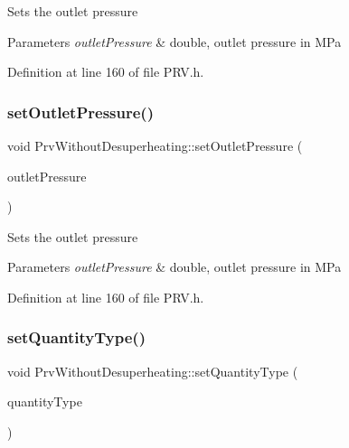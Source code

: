 Sets the outlet pressure


\begin{DoxyParams}{Parameters}
{\em outlet\+Pressure} & double, outlet pressure in M\+Pa \\
\hline
\end{DoxyParams}


Definition at line 160 of file P\+R\+V.\+h.

\mbox{\label{class_prv_without_desuperheating_a0f2a4597b58390e5c4a7c75b38bbebbc}} 
\subsubsection{\texorpdfstring{set\+Outlet\+Pressure()}{setOutletPressure()}\hspace{0.1cm}{\footnotesize\ttfamily [3/3]}}
{\footnotesize\ttfamily void Prv\+Without\+Desuperheating\+::set\+Outlet\+Pressure (\begin{DoxyParamCaption}\item[{double}]{outlet\+Pressure }\end{DoxyParamCaption})\hspace{0.3cm}{\ttfamily [inline]}}

Sets the outlet pressure


\begin{DoxyParams}{Parameters}
{\em outlet\+Pressure} & double, outlet pressure in M\+Pa \\
\hline
\end{DoxyParams}


Definition at line 160 of file P\+R\+V.\+h.

\mbox{\label{class_prv_without_desuperheating_a212177b7a16c7452358df4120196c04b}} 
\subsubsection{\texorpdfstring{set\+Quantity\+Type()}{setQuantityType()}\hspace{0.1cm}{\footnotesize\ttfamily [1/3]}}
{\footnotesize\ttfamily void Prv\+Without\+Desuperheating\+::set\+Quantity\+Type (\begin{DoxyParamCaption}\item[{\hyperlink{class_steam_properties_ae0294bedf7d178c2d8fb6aed0f62fbff}{Steam\+Properties\+::\+Thermodynamic\+Quantity}}]{quantity\+Type }\end{DoxyParamCaption})\hspace{0.3cm}{\ttfamily [inline]}}

